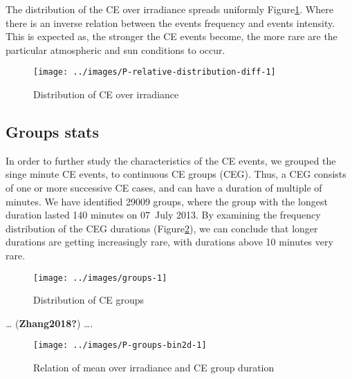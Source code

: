 \documentclass[
]{article}
\begin{document}
The distribution of the CE over irradiance spreads uniformly
Figure\nobreakspace{}\ref{fig:ovir-distribution}. Where there is an inverse relation
between the events frequency and events intensity. This is expected as, the stronger
the CE events become, the more rare are the particular atmospheric and sun conditions
to occur.

\begin{figure}[h!]

{\centering \texttt{[image: ../images/P-relative-distribution-diff-1]} 

}

\caption{Distribution of CE over irradiance}\label{fig:ovir-distribution}
\end{figure}

\FloatBarrier

\hypertarget{groups-stats}{%
\subsection{Groups stats}\label{groups-stats}}

In order to further study the characteristics of the CE events, we grouped the singe
minute CE events, to continuous CE groups (CEG). Thus, a CEG consists of one or more
successive CE cases, and can have a duration of multiple of minutes. We have
identified 29009 groups, where the group with the longest duration lasted
140 minutes on
07~July 2013.
By examining the frequency distribution of the CEG durations
(Figure\nobreakspace{}\ref{fig:ceg-duration-distribution}), we can conclude that longer durations are getting increasingly rare, with durations above 10 minutes very rare.

\begin{figure}[h!]

{\centering \texttt{[image: ../images/groups-1]} 

}

\caption{Distribution of CE groups}\label{fig:ceg-duration-distribution}
\end{figure}

\ldots{} (\textbf{Zhang2018?}) \ldots.

\begin{figure}[h!]

{\centering \texttt{[image: ../images/P-groups-bin2d-1]} 

}

\caption{Relation of mean over irradiance and CE group duration}\label{fig:unnamed-chunk-3}
\end{figure}
\end{document}
